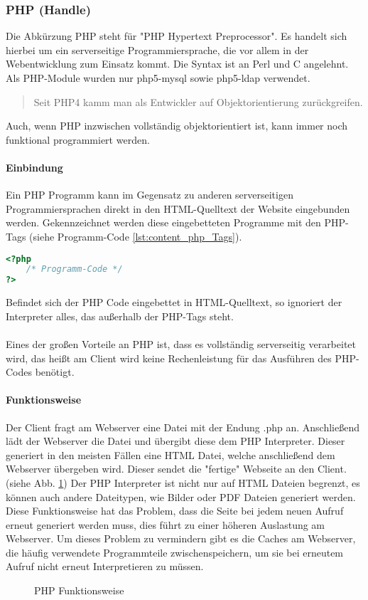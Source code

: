 \subsubsection{PHP (Handle)}
Die Abkürzung PHP steht für "PHP Hypertext Preprocessor". Es handelt sich hierbei um ein serverseitige Programmiersprache, die vor allem in der Webentwicklung zum Einsatz kommt. Die Syntax ist an Perl und C angelehnt.\\
Als PHP-Module wurden nur php5-mysql sowie php5-ldap verwendet.\\
\begin{quote}
Seit PHP4 kamm man als Entwickler auf Objektorientierung zurückgreifen. \cite[S. 231]{php5}
\end{quote}
Auch, wenn PHP inzwischen vollständig objektorientiert ist, kann immer noch funktional programmiert werden.
\paragraph{Einbindung\\}
Ein PHP Programm kann im Gegensatz zu anderen serverseitigen Programmiersprachen direkt in den HTML-Quelltext der Website eingebunden werden. Gekennzeichnet werden diese eingebetteten Programme mit den PHP-Tags (siehe Programm-Code \ref{lst:content_php_Tags}).\\
\begin{lstlisting}[style=custom, language=PHP,  caption={PHP-Tags},label={lst:content_php_Tags}]
<?php 
	/* Programm-Code */
?>
\end{lstlisting}
Befindet sich der PHP Code eingebettet in HTML-Quelltext, so ignoriert der Interpreter alles, das außerhalb der PHP-Tags steht.\\\\
Eines der großen Vorteile an PHP ist, dass es vollständig serverseitig verarbeitet wird, das heißt am Client wird keine Rechenleistung für das Ausführen des PHP-Codes benötigt.
\paragraph{Funktionsweise}
Der Client fragt am Webserver eine Datei mit der Endung .php an. Anschließend lädt der Webserver die Datei und übergibt diese dem PHP Interpreter. Dieser generiert in den meisten Fällen eine HTML Datei, welche anschließend dem Webserver übergeben wird. Dieser sendet die "fertige" Webseite an den Client. (siehe Abb. \ref{fig:content_php_PHP_Funktion}) Der PHP Interpreter ist nicht nur auf HTML Dateien begrenzt, es können auch andere Dateitypen, wie Bilder oder PDF Dateien generiert werden. Diese Funktionsweise hat das Problem, dass die Seite bei jedem neuen Aufruf erneut generiert werden muss, dies führt zu einer höheren Auslastung am Webserver. Um dieses Problem zu vermindern gibt es die Caches am Webserver, die häufig verwendete Programmteile zwischenspeichern, um sie bei erneutem Aufruf nicht erneut Interpretieren zu müssen.
\begin{figure}[H]
\centering
{}
\caption{PHP Funktionsweise}
\label{fig:content_php_PHP_Funktion}
\end{figure}
